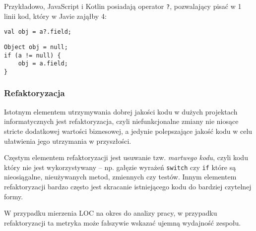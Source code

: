 Przykładowo, JavaScript i Kotlin posiadają operator \texttt{?}, pozwalający pisać w 1 linii kod, który w Javie zająłby 4:
\begin{lstlisting}[caption=Przykład obsługi null (Kotlin)]
val obj = a?.field;
\end{lstlisting}
\begin{lstlisting}[caption=Przykład obsługi null (Java)]
Object obj = null;
if (a != null) {
    obj = a.field;
}
\end{lstlisting}

\subsubsection*{Refaktoryzacja}
Istotnym elementem utrzymywania dobrej jakości kodu w dużych projektach informatycznych jest refaktoryzacja, czyli niefunkcjonalne zmiany nie niosące stricte dodatkowej wartości biznesowej,
a jedynie polepszające jakość kodu w celu ułatwienia jego utrzymania w przyszłości.

Częstym elementem refaktoryzacji jest usuwanie tzw. \textit{martwego kodu}, czyli kodu który nie jest wykorzystywany -- np. gałęzie wyrażeń \texttt{switch} czy \texttt{if} które są nieosiągalne, nieużywanych metod, zmiennych czy testów.
Innym elementem refaktoryzacji bardzo często jest skracanie istniejącego kodu do bardziej czytelnej formy.

W przypadku mierzenia LOC na okres do analizy pracy, w przypadku refaktoryzacji ta metryka może fałszywie wskazać ujemną wydajność zespołu.

